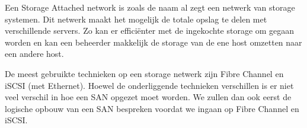 Een Storage Attached network is zoals de naam al zegt een netwerk van storage systemen. Dit netwerk maakt het mogelijk de totale opslag te delen met verschillende servers. Zo kan er effici\"enter met de ingekochte storage om gegaan worden en kan een beheerder makkelijk de storage van de ene host omzetten naar een andere host.

De meest gebruikte technieken op een storage netwerk zijn Fibre Channel en iSCSI (met Ethernet). Hoewel de onderliggende technieken verschillen is er niet veel verschil in hoe een SAN opgezet moet worden. We zullen dan ook eerst de logische opbouw van een SAN bespreken voordat we ingaan op Fibre Channel en iSCSI.
